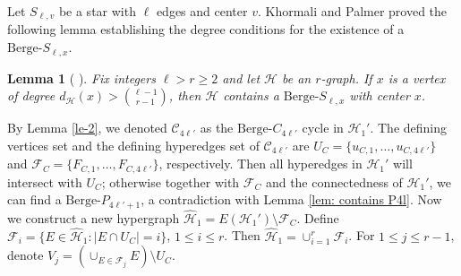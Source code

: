 \documentclass[12pt]{article}%
\newtheorem{lemma}[theorem]{Lemma}
\newcommand{\ber}{\text{Berge-}}
\newcommand{\mh}{\mathcal{H}}
\begin{document}
Let $S_{\ell,v}$ be a star with $\ell$ edges and center $v$. Khormali and Palmer \cite{KHORMALI2022103506} proved the following lemma establishing the degree conditions for the existence of a $\ber S_{\ell,x}$.
\begin{lemma}[ \cite{KHORMALI2022103506}]\label{lem: berge star}
Fix integers $\ell>r\ge 2$ and let $\mh$ be an $r$-graph. If $x$ is a vertex of degree $d_{\mh}(x)>\binom{\ell-1}{r-1}$, then $\mh$ contains a $\ber S_{\ell,x}$ with center $x$.
\end{lemma}



By Lemma \ref{le-2}, we denoted $\mathcal{C}_{4\ell'}$ as the $\ber C_{4\ell'}$ cycle
in $\mh_{1}'$. The defining vertices set and the defining hyperedges set of $\mathcal{C}_{4\ell'}$ are $U_{C}=\{u_{C,1},\ldots,u_{C,4\ell'}\}$ and $\mathcal{F}_{C}=\{F_{C,1},\ldots,F_{C,4\ell'}\}$, respectively. Then all  hyperedges in $\mh_{1}'$ will intersect with $U_{C}$; otherwise together with $\mathcal{F}_{C}$ and the connectedness of $\mh_{1}'$, we can find a $\ber P_{4\ell'+1}$, a contradiction with Lemma \ref{lem: contains P4l}. Now we construct a new hypergraph $\hat{\mh}_{1}=E(\mh_{1}')\setminus \mathcal{F}_{C}$. Define $\mathcal{F}_{i}=\{E\in \hat{\mh}_{1} : |E\cap U_{C}|=i\}$, $1\le i\le r$. Then $\hat{\mh}_{1}=\cup_{i=1}^{r}\mathcal{F}_{i}$. For $1\le j\le r-1$, denote $V_j=(\cup_{E\in \mathcal{F}_{j}}E)\setminus U_C$.
\end{document}
